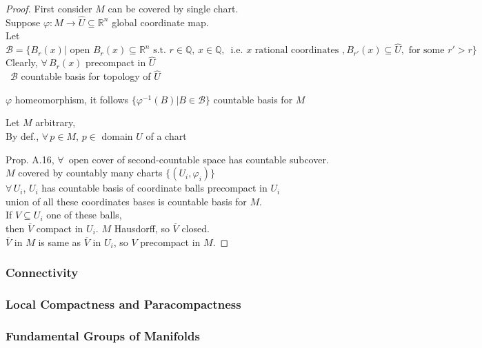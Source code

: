 \begin{proof}
  First consider $M$ can be covered by single chart.  \\
Suppose $\varphi : M \to \widehat{U} \subseteq \mathbb{R}^n$ global coordinate map. \\
Let $\mathcal{B} = \lbrace B_r(x) | \text{ open } B_r(x) \subseteq \mathbb{R}^n \text{ s.t. } r\in \mathbb{Q}, \, x \in \mathbb{Q}, \, \text{ i.e. $x$ rational coordinates }, B_{r'}(x) \subseteq \widehat{U}, \text{ for some } r' > r \rbrace$ \\
Clearly, $\forall \, B_r(x)$ precompact in $\widehat{U}$ \\
\quad \, $\mathcal{B}$ countable basis for topology of $\widehat{U}$

$\varphi$ homeomorphism, it follows $\lbrace \varphi^{-1}(B) | B \in \mathcal{B} \rbrace$ countable basis for $M$

Let $M$ arbitrary, \\
\quad By def., $\forall \, p \in M$, $p \in $ domain $U$ of a chart

Prop. A.16, $\forall \, $ open cover of second-countable space has countable subcover. \\
\quad $M$ covered by countably many charts $\lbrace (U_i, \varphi_i) \rbrace$ \\
$\forall \, U_i$, $U_i$ has countable basis of coordinate balls precompact in $U_i$ \\
union of all these coordinates bases is countable basis for $M$.   \\

If $V \subseteq U_i$ one of these balls,  \\
\quad then $\overline{V}$ compact in $U_i$.  $M$ Hausdorff, so $\overline{V}$ closed.  \\
\quad $\overline{V}$ in $M$ is same as $\overline{V}$ in $U_i$, so $V$ precompact in $M$.   
\end{proof}

\subsubsection*{Connectivity}

\subsubsection*{Local Compactness and Paracompactness}



\subsubsection*{Fundamental Groups of Manifolds}





